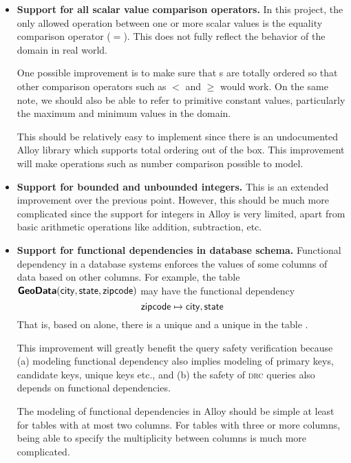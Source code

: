 \begin{itemize}[topsep=0.5pc,itemsep=0.25pc]
    \item  \textbf{Support for all scalar value comparison operators.}\; In this project, the only allowed operation between one or more scalar values is the equality comparison operator ($=$). This does not fully reflect the behavior of the domain in real world.

        One possible improvement is to make sure that s are totally ordered so that other comparison operators such as $<$ and $\geq$ would work. On the same note, we should also be able to refer to primitive constant values, particularly the maximum and minimum values in the domain.

        This should be relatively easy to implement since there is an undocumented Alloy library which supports total ordering out of the box. This improvement will make operations such as number comparison possible to model.

    \item  \textbf{Support for bounded and unbounded integers.}\; This is an extended improvement over the previous point. However, this should be much more complicated since the support for integers in Alloy is very limited, apart from basic arithmetic operations like addition, subtraction, etc.

    \item  \textbf{Support for functional dependencies in database schema.}\; Functional dependency in a database systems enforces the values of some columns of data based on other columns. For example, the table $\rel{GeoData}(\field{city},\field{state},\field{zipcode})$ may have the functional dependency
        \[
            \field{zipcode} \mapsto \field{city},\field{state}
        \]
        That is, based on  alone, there is a unique  and a unique  in the table .

        This improvement will greatly benefit the query safety verification because (a) modeling functional dependency also implies modeling of primary keys, candidate keys, unique keys etc., and (b) the safety of \textsc{drc} queries also depends on functional dependencies.

        The modeling of functional dependencies in Alloy should be simple at least for tables with at most two columns. For tables with three or more columns, being able to specify the multiplicity between columns is much more complicated.

\end{itemize}

